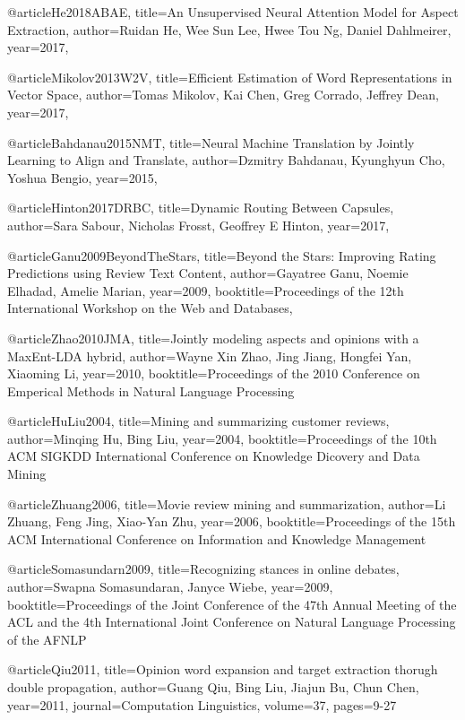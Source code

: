 @article{He2018ABAE,
title={An Unsupervised Neural Attention Model for Aspect Extraction},
author={Ruidan He, Wee Sun Lee, Hwee Tou Ng, Daniel Dahlmeirer},
year={2017},
}

@article{Mikolov2013W2V,
title={Efficient Estimation of Word Representations in Vector Space},
author={Tomas Mikolov, Kai Chen, Greg Corrado, Jeffrey Dean},
year={2017},
}

@article{Bahdanau2015NMT,
title={Neural Machine Translation by Jointly Learning to Align and Translate},
author={Dzmitry Bahdanau, Kyunghyun Cho, Yoshua Bengio},
year={2015},
}

@article{Hinton2017DRBC,
title={Dynamic Routing Between Capsules},
author={Sara Sabour, Nicholas Frosst, Geoffrey E Hinton},
year={2017},
}

@article{Ganu2009BeyondTheStars,
title={Beyond the Stars: Improving Rating Predictions using Review Text Content},
author={Gayatree Ganu, Noemie Elhadad, Amelie Marian},
year={2009},
booktitle={Proceedings of the 12th International Workshop on the Web and Databases},
}

@article{Zhao2010JMA,
title={Jointly modeling aspects and opinions with a MaxEnt-LDA hybrid},
author={Wayne Xin Zhao, Jing Jiang, Hongfei Yan, Xiaoming Li},
year={2010},
booktitle={Proceedings of the 2010 Conference on Emperical Methods in Natural Language Processing}
}

@article{HuLiu2004,
title={Mining and summarizing customer reviews},
author={Minqing Hu, Bing Liu},
year={2004},
booktitle={Proceedings of the 10th ACM SIGKDD International Conference on Knowledge Dicovery and Data Mining}
}

@article{Zhuang2006,
title={Movie review mining and summarization},
author={Li Zhuang, Feng Jing, Xiao-Yan Zhu},
year={2006},
booktitle={Proceedings of the 15th ACM International Conference on Information and Knowledge Management}
}

@article{Somasundarn2009,
title={Recognizing stances in online debates},
author={Swapna Somasundaran, Janyce Wiebe},
year={2009},
booktitle={Proceedings of the Joint Conference of the 47th Annual Meeting of the ACL and the 4th International Joint Conference on Natural Language Processing of the AFNLP}
}

@article{Qiu2011,
title={Opinion word expansion and target extraction thorugh double propagation},
author={Guang Qiu, Bing Liu, Jiajun Bu, Chun Chen},
year={2011},
journal={Computation Linguistics},
volume={37},
pages={9-27}
}

